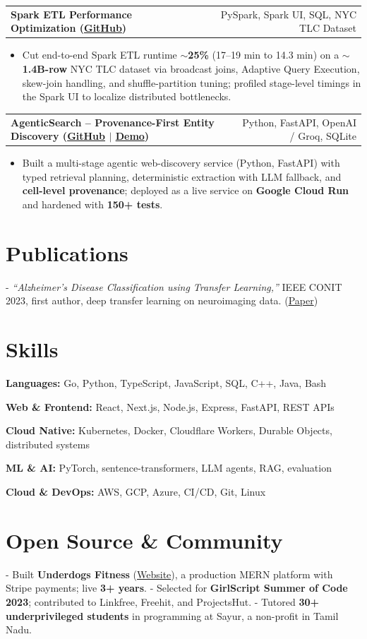 \documentclass[letterpaper,11pt]{article}
\makeatletter
\newcommand{\projItem}[2]{%
  \vspace{2pt}
  \begin{tabular*}{\textwidth}{@{}l@{\extracolsep{\fill}}r@{}}
    \textbf{#1} & #2 \\
  \end{tabular*}\par\vspace{-3pt}
}
\newcommand{\skillLine}[2]{\textbf{#1:} #2\par\vspace{1.5pt}}
\newcommand{\inlineBlock}[1]{{\setlength{\leftskip}{0.18in}\small #1\par}}
\makeatother
\begin{document}
\projItem{Spark ETL Performance Optimization {\normalfont\small(\href{https://github.com/Deva-1903/Spark-ETL-Optimization}{GitHub})}}{PySpark, Spark UI, SQL, NYC TLC Dataset}
\begin{itemize}
  \item Cut end-to-end Spark ETL runtime \textbf{$\sim$25\%} (17--19 min to 14.3 min) on a \textbf{$\sim$1.4B-row} NYC TLC dataset via broadcast joins, Adaptive Query Execution, skew-join handling, and shuffle-partition tuning; profiled stage-level timings in the Spark UI to localize distributed bottlenecks.
\end{itemize}

\projItem{AgenticSearch -- Provenance-First Entity Discovery {\normalfont\small(\href{https://github.com/Deva-1903/ciir_agentic_search}{GitHub} $\vert$ \href{https://agentic-search-negglszkwa-uc.a.run.app}{Demo})}}{Python, FastAPI, OpenAI / Groq, SQLite}
\begin{itemize}
  \item Built a multi-stage agentic web-discovery service (Python, FastAPI) with typed retrieval planning, deterministic extraction with LLM fallback, and \textbf{cell-level provenance}; deployed as a live service on \textbf{Google Cloud Run} and hardened with \textbf{150+ tests}.
\end{itemize}

\section{Publications}
\vspace{2pt}
\inlineBlock{- \textit{``Alzheimer's Disease Classification using Transfer Learning,''} IEEE CONIT 2023, first author, deep transfer learning on neuroimaging data. {\normalfont\small(\href{https://ieeexplore.ieee.org/document/10205760}{Paper})}}

\section{Skills}
\skillLine{Languages}{Go, Python, TypeScript, JavaScript, SQL, C++, Java, Bash}
\skillLine{Web \& Frontend}{React, Next.js, Node.js, Express, FastAPI, REST APIs}
\skillLine{Cloud Native}{Kubernetes, Docker, Cloudflare Workers, Durable Objects, distributed systems}
\skillLine{ML \& AI}{PyTorch, sentence-transformers, LLM agents, RAG, evaluation}
\skillLine{Cloud \& DevOps}{AWS, GCP, Azure, CI/CD, Git, Linux}

\section{Open Source \& Community}
\inlineBlock{- Built \textbf{Underdogs Fitness} (\href{https://www.underdogsfitness.in/}{Website}), a production MERN platform with Stripe payments; live \textbf{3+ years}. - Selected for \textbf{GirlScript Summer of Code 2023}; contributed to Linkfree, Freehit, and ProjectsHut. - Tutored \textbf{30+ underprivileged students} in programming at Sayur, a non-profit in Tamil Nadu.}
\end{document}
